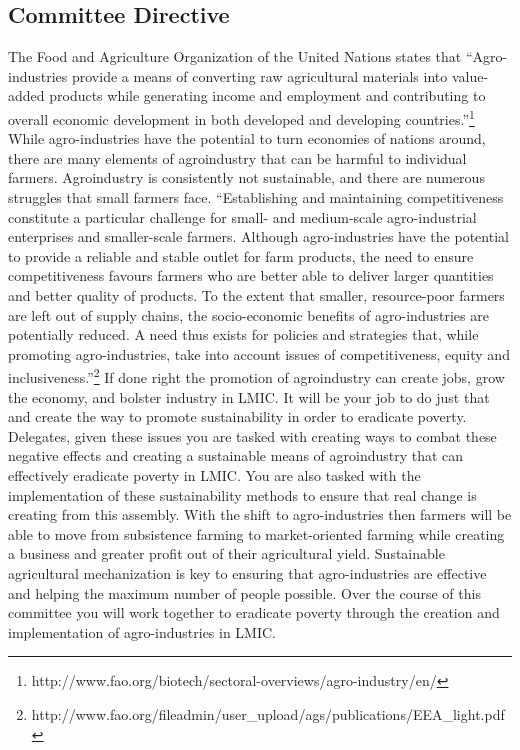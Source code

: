\documentclass[10pt, letterpaper]{article}
\begin{document}
\subsection{Committee Directive}

The Food and Agriculture Organization of the United Nations states that
``Agro-industries provide a means of converting raw agricultural
materials into value-added products while generating income and
employment and contributing to overall economic development in both
developed and developing countries.''\footnote{http://www.fao.org/biotech/sectoral-overviews/agro-industry/en/}
While agro-industries have the potential to turn economies of nations
around, there are many elements of agroindustry that can be harmful to
individual farmers. Agroindustry is consistently not sustainable, and
there are numerous struggles that small farmers face. ``Establishing and
maintaining competitiveness constitute a particular challenge for small-
and medium-scale agro-industrial enterprises and smaller-scale farmers.
Although agro-industries have the potential to provide a reliable and
stable outlet for farm products, the need to ensure competitiveness
favours farmers who are better able to deliver larger quantities and
better quality of products. To the extent that smaller, resource-poor
farmers are left out of supply chains, the socio-economic benefits of
agro-industries are potentially reduced. A need thus exists for policies
and strategies that, while promoting agro-industries, take into account
issues of competitiveness, equity and inclusiveness.''\footnote{http://www.fao.org/fileadmin/user\_upload/ags/publications/EEA\_light.pdf}
If done right the promotion of agroindustry can create jobs, grow the
economy, and bolster industry in LMIC. It will be your job to do just
that and create the way to promote sustainability in order to eradicate
poverty. \\

Delegates, given these issues you are tasked with creating ways to
combat these negative effects and creating a sustainable means of
agroindustry that can effectively eradicate poverty in LMIC. You are
also tasked with the implementation of these sustainability methods to
ensure that real change is creating from this assembly. With the shift
to agro-industries then farmers will be able to move from subsistence
farming to market-oriented farming while creating a business and greater
profit out of their agricultural yield. Sustainable agricultural
mechanization is key to ensuring that agro-industries are effective and
helping the maximum number of people possible. Over the course of this
committee you will work together to eradicate poverty through the
creation and implementation of agro-industries in LMIC. \\
\end{document}
